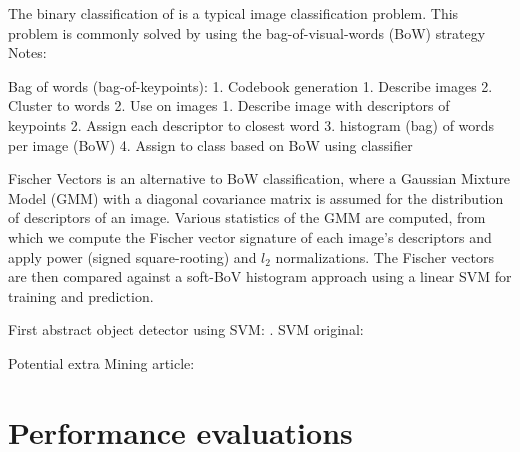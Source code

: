 \documentclass[thesis.tex]{subfiles}
\begin{document}
The binary classification of \citet{dalal2005histograms} is a typical image classification problem. This problem is commonly solved by using the bag-of-visual-words (BoW) strategy
 Notes:
 
 Bag of words (bag-of-keypoints): \cite{csurka2004visual}
 1. Codebook generation
 	1. Describe images
 	2. Cluster to words
 2. Use on images
	1. Describe image with descriptors of keypoints
	2. Assign each descriptor to closest word
	3. histogram (bag) of words per image (BoW)
	4. Assign to class based on BoW using classifier

Fischer Vectors \cite{sanchez2013image} is an alternative to BoW classification, where a Gaussian Mixture Model (GMM) with a diagonal covariance matrix is assumed for the distribution of descriptors of an image. Various statistics of the GMM are computed, from which we compute the Fischer vector signature of each image's descriptors and apply power (signed square-rooting) and $l_2$ normalizations. The Fischer vectors are then compared against a soft-BoV histogram approach using a linear SVM for training and prediction.

First abstract object detector using SVM: \cite{papageorgiou2000trainable}.
SVM original: \cite{boser1992training}
 
Potential extra Mining article: \cite{fernando2014mining}

\section{Performance evaluations}



\subbibliography
\end{document}
